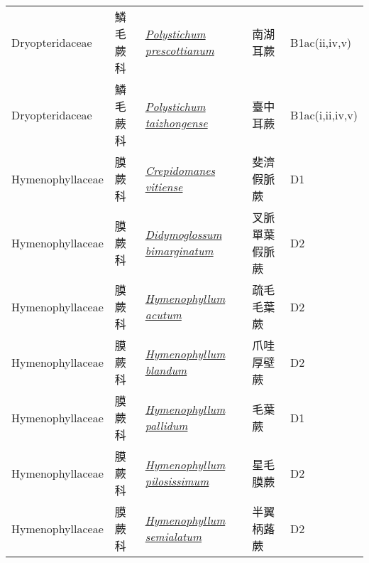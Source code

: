 {\begin{longtable}{p{2.5cm}p{2cm}p{5cm}p{2.5cm}p{3cm}}
    Dryopteridaceae & 鱗毛蕨科 & \href{http://www.theplantlist.org/tpl1.1/search?q=Polystichum+prescottianum}{\textit{Polystichum prescottianum} } & 南湖耳蕨 & B1ac(ii,iv,v) \index{Polystichum@\textit{Polystichum}!prescottianum@\textit{prescottianum}}  \index{南湖耳蕨} \\
    Dryopteridaceae & 鱗毛蕨科 & \href{http://www.theplantlist.org/tpl1.1/search?q=Polystichum+taizhongense}{\textit{Polystichum taizhongense} } & 臺中耳蕨 & B1ac(i,ii,iv,v) \index{Polystichum@\textit{Polystichum}!taizhongense@\textit{taizhongense}}  \index{臺中耳蕨} \\
    Hymenophyllaceae & 膜蕨科 & \href{http://www.theplantlist.org/tpl1.1/search?q=Crepidomanes+vitiense}{\textit{Crepidomanes vitiense} } & 斐濟假脈蕨 & D1 \index{Crepidomanes@\textit{Crepidomanes}!vitiense@\textit{vitiense}}  \index{斐濟假脈蕨} \\
    Hymenophyllaceae & 膜蕨科 & \href{http://www.theplantlist.org/tpl1.1/search?q=Didymoglossum+bimarginatum}{\textit{Didymoglossum bimarginatum} } & 叉脈單葉假脈蕨 & D2 \index{Didymoglossum@\textit{Didymoglossum}!bimarginatum@\textit{bimarginatum}}  \index{叉脈單葉假脈蕨} \\
    Hymenophyllaceae & 膜蕨科 & \href{http://www.theplantlist.org/tpl1.1/search?q=Hymenophyllum+acutum}{\textit{Hymenophyllum acutum} } & 疏毛毛葉蕨 & D2 \index{Hymenophyllum@\textit{Hymenophyllum}!acutum@\textit{acutum}}  \index{疏毛毛葉蕨} \\
    Hymenophyllaceae & 膜蕨科 & \href{http://www.theplantlist.org/tpl1.1/search?q=Hymenophyllum+blandum}{\textit{Hymenophyllum blandum} } & 爪哇厚壁蕨 & D2 \index{Hymenophyllum@\textit{Hymenophyllum}!blandum@\textit{blandum}}  \index{爪哇厚壁蕨} \\
    Hymenophyllaceae & 膜蕨科 & \href{http://www.theplantlist.org/tpl1.1/search?q=Hymenophyllum+pallidum}{\textit{Hymenophyllum pallidum} } & 毛葉蕨 & D1 \index{Hymenophyllum@\textit{Hymenophyllum}!pallidum@\textit{pallidum}}  \index{毛葉蕨} \\
    Hymenophyllaceae & 膜蕨科 & \href{http://www.theplantlist.org/tpl1.1/search?q=Hymenophyllum+pilosissimum}{\textit{Hymenophyllum pilosissimum} } & 星毛膜蕨 & D2 \index{Hymenophyllum@\textit{Hymenophyllum}!pilosissimum@\textit{pilosissimum}}  \index{星毛膜蕨} \\
    Hymenophyllaceae & 膜蕨科 & \href{http://www.theplantlist.org/tpl1.1/search?q=Hymenophyllum+semialatum}{\textit{Hymenophyllum semialatum} } & 半翼柄蕗蕨 & D2 \index{Hymenophyllum@\textit{Hymenophyllum}!semialatum@\textit{semialatum}}  \index{半翼柄蕗蕨} \\

\end{longtable}}
